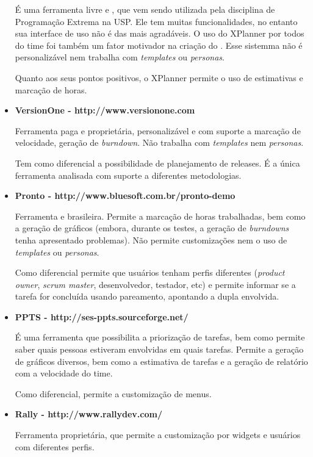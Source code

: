 \begin{itemize}
{É uma ferramenta livre e \opensource{}, que vem sendo utilizada pela disciplina de Programação Extrema na USP. Ele tem muitas funcionalidades, no entanto sua interface de uso não é das mais agradáveis. O uso do XPlanner por todos do time foi também um fator motivador na criação do \calopsita{}. Esse sistemma não é personalizável nem trabalha com \textit{templates} ou \textit{personas}.

Quanto aos seus pontos positivos, o XPlanner permite o uso de estimativas e marcação de horas.}

\item{\textbf{VersionOne - http://www.versionone.com}

Ferramenta paga  e proprietária, personalizável e com suporte a marcação de velocidade, geração de \textit{burndown}. Não trabalha com \textit{templates} nem \textit{personas}.

Tem como diferencial a possibilidade de planejamento de releases. É a única ferramenta analisada com suporte a diferentes metodologias.}

\item{\textbf{Pronto - http://www.bluesoft.com.br/pronto-demo}

Ferramenta \opensource{} e brasileira. Permite a marcação de horas trabalhadas, bem como a geração de gráficos (embora, durante os testes, a geração de \textit{burndowns} tenha apresentado problemas). Não permite customizações nem o uso de \textit{templates} ou \textit{personas}. 

Como diferencial permite que usuários tenham perfis diferentes (\textit{product owner}, \textit{scrum master}, desenvolvedor, testador, etc) e permite informar se a tarefa for concluída usando pareamento, apontando a dupla envolvida.}

\item{\textbf{PPTS - http://ses-ppts.sourceforge.net/}

É uma ferramenta \opensource{} que possibilita a priorização de tarefas, bem como permite saber quais pessoas estiveram envolvidas em quais tarefas. Permite a geração de gráficos diversos, bem como a estimativa de tarefas e a geração de relatório com a velocidade do time. 

Como diferencial, permite a customização de menus.}

\item{\textbf{Rally - http://www.rallydev.com/}

Ferramenta proprietária, que permite a customização por widgets e usuários com diferentes perfis. 

}
\end{itemize}
